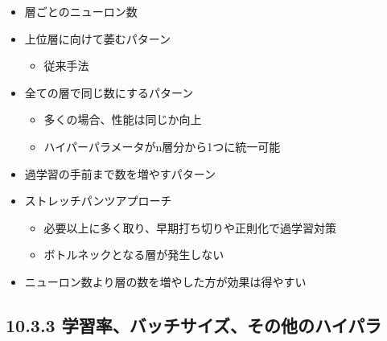 \begin{itemize}
\tightlist
\item
  層ごとのニューロン数
\item
  上位層に向けて萎むパターン

  \begin{itemize}
  \tightlist
  \item
    従来手法
  \end{itemize}
\item
  全ての層で同じ数にするパターン

  \begin{itemize}
  \tightlist
  \item
    多くの場合、性能は同じか向上
  \item
    ハイパーパラメータがn層分から1つに統一可能
  \end{itemize}
\item
  過学習の手前まで数を増やすパターン
\item
  ストレッチパンツアプローチ

  \begin{itemize}
  \tightlist
  \item
    必要以上に多く取り、早期打ち切りや正則化で過学習対策
  \item
    ボトルネックとなる層が発生しない
  \end{itemize}
\item
  ニューロン数より層の数を増やした方が効果は得やすい
\end{itemize}

\hypertarget{ux5b66ux7fd2ux7387ux30d0ux30c3ux30c1ux30b5ux30a4ux30baux305dux306eux4ed6ux306eux30cfux30a4ux30d1ux30e9}{%
\subsection{10.3.3
学習率、バッチサイズ、その他のハイパラ}\label{ux5b66ux7fd2ux7387ux30d0ux30c3ux30c1ux30b5ux30a4ux30baux305dux306eux4ed6ux306eux30cfux30a4ux30d1ux30e9}}

